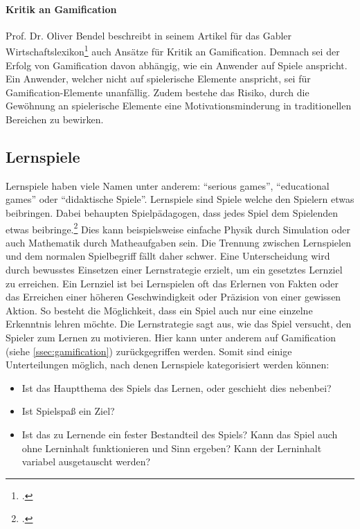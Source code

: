     \paragraph{Kritik an Gamification}
    Prof. Dr. Oliver Bendel beschreibt in seinem Artikel für das Gabler Wirtschaftslexikon\footcite{gabler-gamification} auch Ansätze für Kritik an Gamification. Demnach sei der Erfolg von Gamification davon abhängig, wie ein Anwender auf Spiele anspricht. Ein Anwender, welcher nicht auf spielerische Elemente anspricht, sei für Gamification-Elemente unanfällig. Zudem bestehe das Risiko, durch die Gewöhnung an spielerische Elemente eine Motivationsminderung in traditionellen Bereichen zu bewirken.

\subsection{Lernspiele}
	Lernspiele haben viele Namen unter anderem: \enquote{serious games}, \enquote{educational games} oder \enquote{didaktische Spiele}.
	Lernspiele sind Spiele welche den Spielern etwas beibringen. Dabei behaupten Spielpädagogen, dass jedes Spiel dem Spielenden etwas beibringe.\footcite{lernspiel} Dies kann beispielsweise einfache Physik durch Simulation oder auch Mathematik durch Matheaufgaben sein. Die Trennung zwischen Lernspielen und dem normalen Spielbegriff fällt daher schwer. Eine Unterscheidung wird durch bewusstes Einsetzen einer Lernstrategie erzielt, um ein gesetztes Lernziel zu erreichen.
	Ein Lernziel ist bei Lernspielen oft das Erlernen von Fakten oder das Erreichen einer höheren Geschwindigkeit oder Präzision von einer gewissen Aktion. So besteht die Möglichkeit, dass ein Spiel auch nur eine einzelne Erkenntnis lehren möchte.
	Die Lernstrategie sagt aus, wie das Spiel versucht, den Spieler zum Lernen zu motivieren. Hier kann unter anderem auf Gamification (siehe \ref{ssec:gamification}) zurückgegriffen werden.
	Somit sind einige Unterteilungen möglich, nach denen Lernspiele kategorisiert werden können:
	\begin{itemize}
		\item{ Ist das Hauptthema des Spiels das Lernen, oder geschieht dies nebenbei?}
		\item{ Ist Spielspaß ein Ziel? }
		\item{ Ist das zu Lernende ein fester Bestandteil des Spiels? Kann das Spiel auch ohne Lerninhalt funktionieren und Sinn ergeben? Kann der Lerninhalt variabel ausgetauscht werden? }
	\end{itemize}
